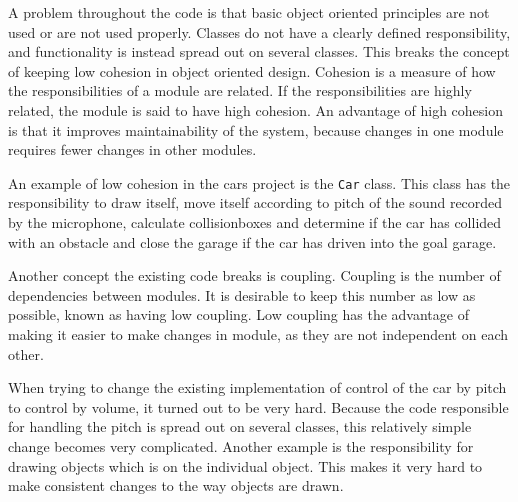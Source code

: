 A problem throughout the code is that basic object oriented principles are not used or are not used properly. 
Classes do not have a clearly defined responsibility, and functionality is instead spread out on several classes. 
This breaks the concept of keeping low cohesion in object oriented design. 
Cohesion is a measure of how the responsibilities of a module are related. 
If the responsibilities are highly related, the module is said to have high cohesion.
An advantage of high cohesion is that it improves maintainability of the system, because changes in one module requires fewer changes in other modules. 

An example of low cohesion in the cars project is the \lstinline!Car! class. 
This class has the responsibility to draw itself, move itself according to pitch of the sound recorded by the microphone, calculate collisionboxes and determine if the car has collided with an obstacle and close the garage if the car has driven into the goal garage.

Another concept the existing code breaks is coupling.
Coupling is the number of  dependencies between modules.
It is desirable to keep this number as low as possible, known as having low coupling.
Low coupling has the advantage of making it easier to make changes in module, as they are not independent on each other.

When trying to change the existing implementation of control of the car by pitch to control by volume, it turned out to be very hard.
Because the code responsible for handling the pitch is spread out on several classes, this relatively simple change becomes very complicated.
Another example is the responsibility for drawing objects which is on the individual object. 
This makes it very hard to make consistent changes to the way objects are drawn.
